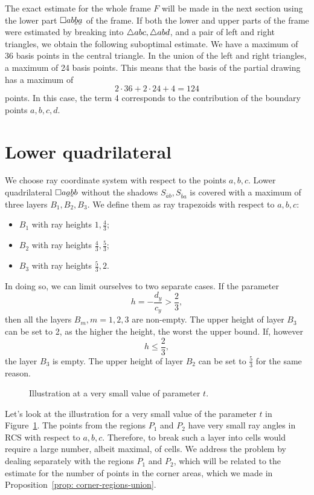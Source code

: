The exact estimate for the whole frame $F$ will be made in the next section using the lower part $\rectansym{ab\undersym{b}\undersym{a}}$ of the frame. If both the lower and upper parts of the frame were estimated by breaking into $\triangle{abc}, \triangle{abd}$, and a pair of left and right triangles, we obtain the following suboptimal estimate. We have a maximum of 36 basis points in the central triangle. In the union of the left and right triangles, a maximum of 24 basis points. This means that the basis of the partial drawing has a maximum of
$$
2 \cdot 36 + 2 \cdot 24 + 4 = 124
$$
points. In this case, the term 4 corresponds to the contribution of the boundary points $ a, b, c, d $.


\section{Lower quadrilateral}
We choose ray coordinate system with respect to the points $a,b,c$. Lower quadrilateral $\rectansym{a\undersym{a}\undersym{b}b}$ without the shadows $S_{\overline{a}b}, S_{\overline{b}a}$ is covered with a maximum of three layers $B_{1},B_{2},B_{3}$. We define them as ray trapezoids with respect to $a, b, c$:
\begin{itemize}
\item $B_{1}$ with ray heights $1,\frac{4}{3}$;
\item $B_{2}$ with ray heights $\frac{4}{3},\frac{5}{3}$;
\item $B_{3}$ with ray heights $\frac{5}{3},2$.
\end{itemize}

In doing so, we can limit ourselves to two separate cases. If the parameter
$$
h = -\frac{d_{y}}{c_{y}} > \frac{2}{3},
$$
then all the layers $B_{m}, m = 1,2,3$ are non-empty. The upper height of layer $B_{3}$ can be set to 2, as the higher the height, the worst the upper bound. If, however
$$
h \leq \frac{2}{3},
$$
the layer $B_{3}$ is empty. The upper height of layer $B_{2}$ can be set to $\frac{5}{3}$ for the same reason.

\begin{figure}
\begin{center}

\end{center}
\caption{Illustration at a very small value of parameter $t$.}
\label{fig: half-shadows}
\end{figure}

Let's look at the illustration for a very small value of the parameter $t$ in Figure~\ref{fig: half-shadows}. The points from the regions $P_{1}$ and $P_{2}$ have very small ray angles in RCS with respect to $a, b, c$. Therefore, to break such a layer into cells would require a large number, albeit maximal, of cells. We address the problem by dealing separately with the regions $P_ {1}$ and $P_{2}$, which will be related to the estimate for the number of points in the corner areas, which we made in Proposition~\ref{prop: corner-regions-union}.

